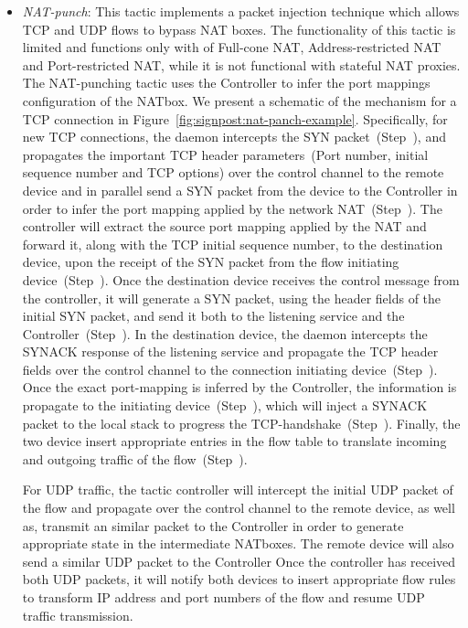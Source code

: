 \begin{itemize}
  \item \emph{NAT-punch}: This tactic implements a packet injection technique which
    allows TCP and UDP flows to bypass NAT boxes. The functionality of this
    tactic is limited and functions only with of Full-cone NAT,
    Address-restricted NAT and Port-restricted NAT, while it is not functional
    with stateful NAT proxies.  The NAT-punching tactic uses the Controller to
    infer the port mappings configuration of the NATbox. We present a schematic
    of the mechanism for a TCP connection in
    Figure~\ref{fig:signpost:nat-panch-example}. Specifically, for new TCP
    connections, the daemon intercepts the SYN packet~(Step~), and
    propagates the important TCP header parameters~(Port number, initial
    sequence number and TCP options) over the control channel to the remote
    device and in parallel send a SYN packet from the device to the Controller
    in order to infer the port mapping applied by the network
    NAT~(Step~). The controller  will extract the source port mapping
    applied by the NAT and forward it, along with the TCP initial sequence
    number, to the destination device, upon the receipt of the SYN packet from
    the flow initiating device~(Step~).  Once the destination device
    receives the control message from the controller, it will generate a SYN
    packet, using the header fields of the initial SYN packet, and send it both
    to the listening service and the \signpost Controller~(Step~). In
    the destination device, the \signpost daemon intercepts the SYNACK response
    of the listening service and propagate the TCP header fields over the
    control channel to the connection initiating device~(Step~).  Once
    the exact port-mapping is inferred by the Controller, the information is
    propagate to the initiating device~(Step~), which will inject a
    SYNACK packet to the local stack to progress the
    TCP-handshake~(Step~). Finally, the two device insert appropriate
    entries in the \of flow table to translate incoming and outgoing traffic of
    the flow~(Step~).

    For UDP traffic, the tactic controller will intercept the initial UDP packet
    of the flow and propagate over the control channel to the remote device, as
    well as, transmit an similar packet to the Controller in order to generate
    appropriate state in the intermediate NATboxes. The remote device will also
    send a similar UDP packet to the Controller Once the controller has received
    both UDP packets, it will notify both devices to insert appropriate flow
    rules to transform IP address and port numbers of the flow and resume UDP
    traffic transmission. 
    

\end{itemize}

